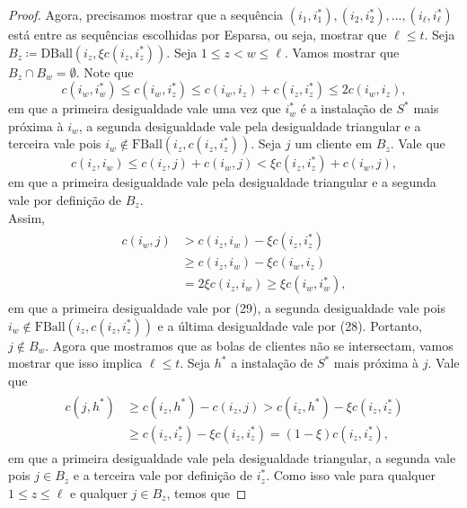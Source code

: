 \begin{proof}
    Agora, precisamos mostrar que a sequência $(i_1,i_1^*), (i_2,i_2^*), \ldots, (i_{\ell},i_{\ell}^*)$ está entre as sequências escolhidas por {\sc Esparsa}, ou seja, mostrar que $\ell \leq t$. Seja ${B_z \coloneqq \text{DBall}(i_z,\xi c(i_z,i_z^*))}$. Seja $1 \leq z < w \leq \ell$. Vamos mostrar que $B_z \cap B_w = \emptyset$. 
    Note que 
    \begin{equation}
        c(i_w,i_w^*) \leq c(i_w,i_z^*) \leq c(i_w,i_z) + c(i_z,i_z^*) \leq 2 c(i_w,i_z),
    \end{equation}
    em que a primeira desigualdade vale uma vez que $i_w^*$ é a instalação de $S^*$ mais próxima à $i_w$, a segunda desigualdade vale pela desigualdade triangular e a terceira vale pois $i_w \not \in \text{FBall}(i_z,c(i_z,i_z^*))$. Seja $j$ um cliente em $B_z$.
    Vale que
    \begin{equation}
        c(i_z,i_w) \leq c(i_z,j) + c(i_w,j) < \xi c(i_z,i_z^*) + c(i_w,j),
    \end{equation}
    em que a primeira desigualdade vale pela desigualdade triangular e a segunda vale por definição de $B_z$. \\
    Assim,
        \begin{align}
            \begin{split}\nonumber
        c(i_w,j) &> c(i_z,i_w) - \xi c(i_z,i_z^*) \\
        &\geq c(i_z,i_w) - \xi c (i_w,i_z) \\
        &= 2\xi c(i_z,i_w) \geq \xi c(i_w,i_w^*),
            \end{split}
        \end{align}
    em que a primeira desigualdade vale por (29), a segunda desigualdade vale pois ${i_w \not \in \text{FBall}(i_z,c(i_z,i_z^*))}$ e a última desigualdade vale por (28).
    Portanto, $j \not \in B_w$. Agora que mostramos que as bolas de clientes não se intersectam, vamos mostrar que isso implica $\ell \leq t$. Seja $h^*$ a instalação de $S^*$ mais próxima à $j$. Vale que
        \begin{align}
            \begin{split} \nonumber
            c(j,h^*) &\geq c(i_z,h^*) - c(i_z,j) > c(i_z,h^*) - \xi c(i_z,i_z^*) \\
            &\geq c(i_z,i_z^*) - \xi c(i_z,i_z^*) = (1 - \xi) c(i_z,i_z^*),
            \end{split}
        \end{align}
    em que a primeira desigualdade vale pela desigualdade triangular, a segunda vale pois $j \in B_z$ e a terceira vale por definição de $i_z^*$. Como isso vale para qualquer $1 \leq z\leq \ell$ e qualquer $j \in B_z$, temos que

\end{proof}
